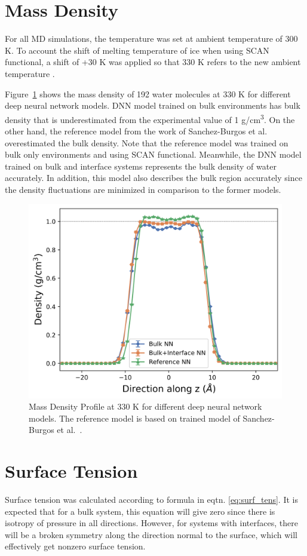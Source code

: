 \section{Mass Density}
For all MD simulations, the temperature was set at ambient temperature of 300
K. To account the shift of melting temperature of ice when using SCAN
functional,
a shift of +30 K was applied so that 330 K refers to the new ambient
temperature \cite{piaggi2021phase}.

Figure~\ref{fig:density} shows the mass density of 192 water molecules at 330 K
for different deep neural network models. DNN model trained on bulk
environments has bulk
density that is underestimated from the experimental value of 1 \unit{
	g/cm^3}. On the other hand, the reference model from the work of
Sanchez-Burgos et
al.~\cite{sanchez2023deep}  overestimated the bulk density. Note that the
reference model was trained on bulk only environments and using SCAN
functional. Meanwhile,
the DNN model trained on  bulk and interface systems  represents the
bulk density of water accurately. In addition, this model also describes
the bulk region accurately since the density fluctuations are minimized in
comparison to the former models.
\begin{figure}[tbhp!]
	\centering
	\includegraphics[width=0.65\linewidth]{images/density_330.png}
	\caption{Mass Density Profile at 330 K for different deep neural
		network
		models. The reference model is based on trained model of
		Sanchez-Burgos et
		al.~\cite{sanchez2023deep}. }
	\label{fig:density}
\end{figure}

\section{Surface Tension}
Surface tension was calculated according to formula in eqtn.
\eqref{eq:surf_tens}. It is expected that for a bulk system, this equation will
give zero since there is isotropy of pressure in all directions. However, for
systems with interfaces, there will be a broken symmetry along the direction
normal to the surface, which will effectively get nonzero surface tension.

